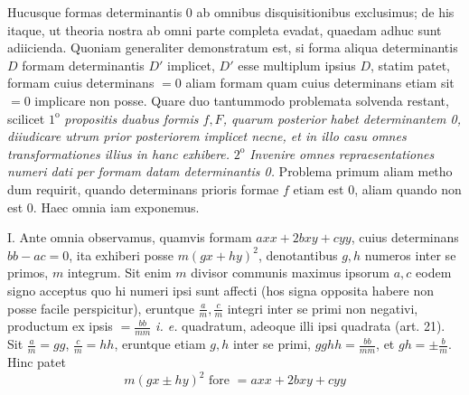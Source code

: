 Hucusque formas determinantis 0 ab omnibus disquisitionibus exclusimus; de his itaque, ut theoria nostra ab omni parte completa evadat, quaedam adhuc sunt adiicienda. Quoniam generaliter demonstratum est, si forma aliqua determinantis $D$ formam determinantis $D'$ implicet, $D'$ esse multiplum ipsius $D$, statim patet, formam cuius determinans $=0$ aliam formam quam cuius determinans etiam sit $=0$ implicare non posse. Quare duo tantummodo problemata solvenda restant, scilicet $1^{\mathrm{o}}$ \textit{propositis duabus formis $f,F$, quarum posterior habet determinantem 0, diiudicare utrum prior posteriorem implicet necne, et in illo casu omnes transformationes illius in hanc exhibere.} $2^{\mathrm{o}}$ \textit{Invenire omnes repraesentationes numeri dati per formam datam determinantis 0.} Problema primum aliam metho%
%
dum requirit, quando determinans prioris formae $f$ etiam est 0, aliam quando non est 0. Haec omnia iam exponemus.

I. Ante omnia observamus, quamvis formam $axx+2bxy+cyy$, cuius determinans $bb-ac=0$, ita exhiberi posse $m(gx+hy)^2$, denotantibus $g,h$ numeros inter se primos, $m$ integrum. Sit enim $m$ divisor communis maximus ipsorum $a,c$ eodem signo acceptus quo hi numeri ipsi sunt affecti (hos signa opposita habere non posse facile perspicitur), eruntque $\frac{a}{m},\frac{c}{m}$ integri inter se primi non negativi, productum ex ipsis $=\frac{bb}{mm}$ \textit{i. e.} quadratum, adeoque illi ipsi quadrata (art. 21). Sit $\frac{a}{m}=gg$, $\frac{c}{m}=hh$, eruntque etiam $g,h$ inter se primi, $gghh=\frac{bb}{mm}$, et $gh=\pm\frac{b}{m}$. Hinc patet
\[
m(gx\pm hy)^2\text{ fore }=axx+2bxy+cyy
\]

